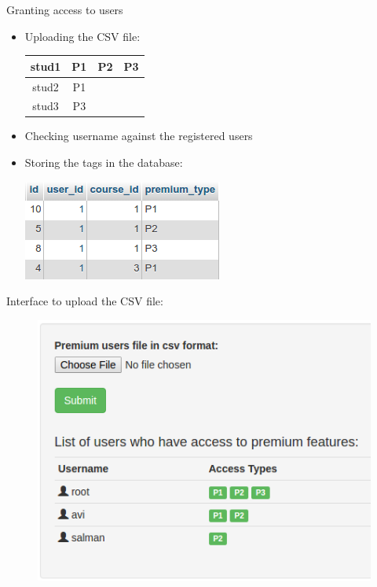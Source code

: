 \documentclass{beamer}
\begin{document}
\begin{frame}{Granting access to users}
	\begin{itemize}
		\item Uploading the CSV file:
		\begin{center}
		\begin{tabular}{|c|c|c|c|}
			\hline stud1 & P1 & P2 & P3 \\ 
			\hline stud2 & P1 &  &  \\ 
			\hline stud3 & P3 &  &  \\ 
			\hline 
		\end{tabular}
		\end{center} 
		\item Checking username against the registered users
		\item Storing the tags in the database: 
		\begin{center}
			\includegraphics[width=0.5\linewidth]{media/premiumAccesses}
		\end{center}
	\end{itemize}
\end{frame}

\begin{frame}
	Interface to upload the CSV file:
\begin{figure}
\centering
\includegraphics[width=0.8\linewidth]{media/CSVupload}
\label{fig:CSVupload}
\end{figure}
\end{frame}
\end{document}
